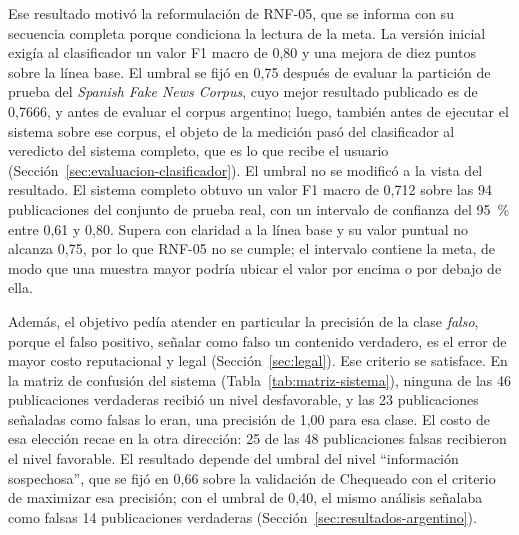 Ese resultado motivó la reformulación de RNF-05, que se informa con su secuencia completa porque condiciona la lectura de la meta. La versión inicial exigía al clasificador un valor F1 macro de 0,80 y una mejora de diez puntos sobre la línea base. El umbral se fijó en 0,75 después de evaluar la partición de prueba del \textit{Spanish Fake News Corpus}, cuyo mejor resultado publicado es de 0,7666, y antes de evaluar el corpus argentino; luego, también antes de ejecutar el sistema sobre ese corpus, el objeto de la medición pasó del clasificador al veredicto del sistema completo, que es lo que recibe el usuario (Sección~\ref{sec:evaluacion-clasificador}). El umbral no se modificó a la vista del resultado. El sistema completo obtuvo un valor F1 macro de 0,712 sobre las 94 publicaciones del conjunto de prueba real, con un intervalo de confianza del 95~\% entre 0,61 y 0,80. Supera con claridad a la línea base y su valor puntual no alcanza 0,75, por lo que RNF-05 no se cumple; el intervalo contiene la meta, de modo que una muestra mayor podría ubicar el valor por encima o por debajo de ella.

Además, el objetivo pedía atender en particular la precisión de la clase \textit{falso}, porque el falso positivo, señalar como falso un contenido verdadero, es el error de mayor costo reputacional y legal (Sección~\ref{sec:legal}). Ese criterio se satisface. En la matriz de confusión del sistema (Tabla~\ref{tab:matriz-sistema}), ninguna de las 46 publicaciones verdaderas recibió un nivel desfavorable, y las 23 publicaciones señaladas como falsas lo eran, una precisión de 1,00 para esa clase. El costo de esa elección recae en la otra dirección: 25 de las 48 publicaciones falsas recibieron el nivel favorable. El resultado depende del umbral del nivel \enquote{información sospechosa}, que se fijó en 0,66 sobre la validación de Chequeado con el criterio de maximizar esa precisión; con el umbral de 0,40, el mismo análisis señalaba como falsas 14 publicaciones verdaderas (Sección~\ref{sec:resultados-argentino}).

